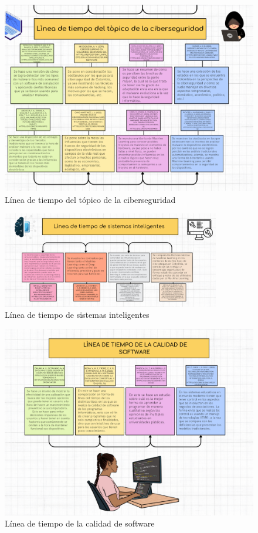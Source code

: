 \begin{figure}[ht!]
  \centering
  \includegraphics[height=0.5\textheight]{./pictures/timeline_2.png}
  \caption{Línea de tiempo del tópico de la ciberseguridad}
  \label{fig:timeline2}
\end{figure} 

\begin{figure}[hb!]
  \includegraphics[width=0.85\textwidth]{./pictures/timeline_3.png}
  \caption{Línea de tiempo de sistemas inteligentes}
  \label{fig:timeline3}
\end{figure} 

\begin{figure}[ht!]
  \centering
  \includegraphics[width=1\textwidth]{./pictures/timeline_4.png}
  \caption{Línea de tiempo de la calidad de software}
  \label{fig:timeline4}
\end{figure} 

